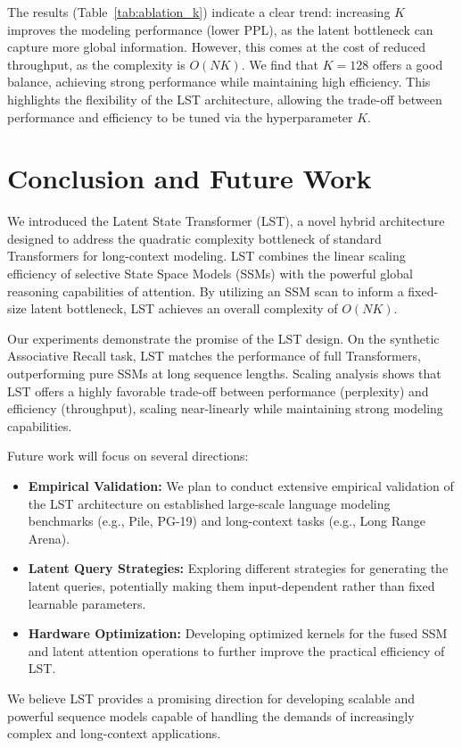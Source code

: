 \documentclass[10pt,twocolumn,letterpaper]{article}
\begin{document}
The results (Table~\ref{tab:ablation_k}) indicate a clear trend: increasing \(K\) improves the modeling performance (lower PPL), as the latent bottleneck can capture more global information. However, this comes at the cost of reduced throughput, as the complexity is \(O(NK)\). We find that \(K=128\) offers a good balance, achieving strong performance while maintaining high efficiency. This highlights the flexibility of the LST architecture, allowing the trade-off between performance and efficiency to be tuned via the hyperparameter \(K\).

\section{Conclusion and Future Work}

We introduced the Latent State Transformer (LST), a novel hybrid architecture designed to address the quadratic complexity bottleneck of standard Transformers for long-context modeling. LST combines the linear scaling efficiency of selective State Space Models (SSMs) with the powerful global reasoning capabilities of attention. By utilizing an SSM scan to inform a fixed-size latent bottleneck, LST achieves an overall complexity of \(O(NK)\).

Our experiments demonstrate the promise of the LST design. On the synthetic Associative Recall task, LST matches the performance of full Transformers, outperforming pure SSMs at long sequence lengths. Scaling analysis shows that LST offers a highly favorable trade-off between performance (perplexity) and efficiency (throughput), scaling near-linearly while maintaining strong modeling capabilities.

Future work will focus on several directions:
\begin{itemize}
    \item \textbf{Empirical Validation:} We plan to conduct extensive empirical validation of the LST architecture on established large-scale language modeling benchmarks (e.g., Pile, PG-19) and long-context tasks (e.g., Long Range Arena).
    \item \textbf{Latent Query Strategies:} Exploring different strategies for generating the latent queries, potentially making them input-dependent rather than fixed learnable parameters.
    \item \textbf{Hardware Optimization:} Developing optimized kernels for the fused SSM and latent attention operations to further improve the practical efficiency of LST.
\end{itemize}
We believe LST provides a promising direction for developing scalable and powerful sequence models capable of handling the demands of increasingly complex and long-context applications.
\end{document}
